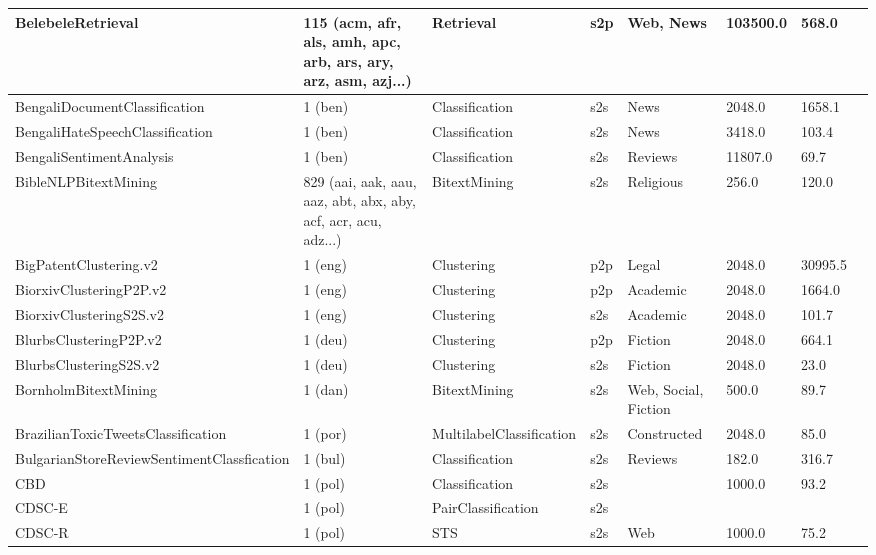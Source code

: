 \begin{longtable}{L{5.0cm}|L{1.5cm}L{1.4cm}L{1.4cm}L{1.4cm}L{1.4cm}L{1.0cm}L{1.0cm}}
 \hline 
BelebeleRetrieval \cite{bandarkar2023belebele} & 115 (acm, afr, als, amh, apc, arb, ars, ary, arz, asm, azj...) & Retrieval & s2p & Web, News & 103500.0 & 568.0 \\
 \hline 
BengaliDocumentClassification \cite{akash-etal-2023-shironaam} & 1 (ben) & Classification & s2s & News & 2048.0 & 1658.1 \\
 \hline 
BengaliHateSpeechClassification \cite{karim2020BengaliNLP} & 1 (ben) & Classification & s2s & News & 3418.0 & 103.4 \\
 \hline 
BengaliSentimentAnalysis \cite{sazzed2020cross} & 1 (ben) & Classification & s2s & Reviews & 11807.0 & 69.7 \\
 \hline 
BibleNLPBitextMining \cite{akerman2023ebible} & 829 (aai, aak, aau, aaz, abt, abx, aby, acf, acr, acu, adz...) & BitextMining & s2s & Religious & 256.0 & 120.0 \\
 \hline 
BigPatentClustering.v2 \cite{DBLP:journals/corr/abs-1906-03741} & 1 (eng) & Clustering & p2p & Legal & 2048.0 & 30995.5 \\
 \hline 
BiorxivClusteringP2P.v2  & 1 (eng) & Clustering & p2p & Academic & 2048.0 & 1664.0 \\
 \hline 
BiorxivClusteringS2S.v2  & 1 (eng) & Clustering & s2s & Academic & 2048.0 & 101.7 \\
 \hline 
BlurbsClusteringP2P.v2 \cite{Remus2019GermEval2T} & 1 (deu) & Clustering & p2p & Fiction & 2048.0 & 664.1 \\
 \hline 
BlurbsClusteringS2S.v2 \cite{Remus2019GermEval2T} & 1 (deu) & Clustering & s2s & Fiction & 2048.0 & 23.0 \\
 \hline 
BornholmBitextMining \cite{derczynskiBornholmskNaturalLanguage2019} & 1 (dan) & BitextMining & s2s & Web, Social, Fiction & 500.0 & 89.7 \\
 \hline 
BrazilianToxicTweetsClassification \cite{DBLP:journals/corr/abs-2010-04543} & 1 (por) & MultilabelClassification & s2s & Constructed & 2048.0 & 85.0 \\
 \hline 
BulgarianStoreReviewSentimentClassfication \cite{DVN/TXIK9P_2018} & 1 (bul) & Classification & s2s & Reviews & 182.0 & 316.7 \\
 \hline 
CBD \cite{ogr:kob:19:poleval} & 1 (pol) & Classification & s2s &  & 1000.0 & 93.2 \\
 \hline 
CDSC-E \cite{wroblewska-krasnowska-kieras-2017-polish} & 1 (pol) & PairClassification & s2s &  &  &  \\
 \hline 
CDSC-R \cite{wroblewska-krasnowska-kieras-2017-polish} & 1 (pol) & STS & s2s & Web & 1000.0 & 75.2 \\

\end{longtable}
